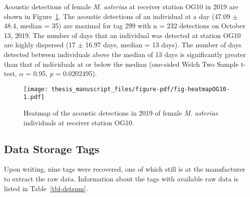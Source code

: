 \documentclass[
  authoryear,
  review,
  3p]{elsarticle}
\begin{document}
Acoustic detections of female \emph{M. asterias} at receiver station
OG10 in 2019 are shown in Figure~\ref{fig-heatmapOG10}. The acoustic
detections of an individual at a day (47.09 \(\pm\) 48.4, median = 35)
are maximal for tag 299 with n = 232 detections on October 13, 2019. The
number of days that an individual was detected at station OG10 are
highly dispersed (17 \(\pm\) 16.97 days, median = 13 days). The number
of days detected between individuals above the median of 13 days is
significantly greater than that of individuals at or below the median
(one-sided Welch Two Sample t-test, \(\alpha\) = 0.95, \emph{p} =
0.0202495).

\begin{figure}[H]

{\centering \texttt{[image: thesis\_manuscript\_files/figure-pdf/fig-heatmapOG10-1.pdf]}

}

\caption{\label{fig-heatmapOG10}Heatmap of the acoustic detections in
2019 of female \emph{M. asterias} individuals at receiver station OG10.}

\end{figure}

\hypertarget{sec-results-dst}{%
\subsection{Data Storage Tags}\label{sec-results-dst}}

Upon writing, nine tags were recovered, one of which still is at the
manufacturer to extract the raw data. Information about the tags with
available raw data is listed in Table~\ref{tbl-dstsum}.
\end{document}
